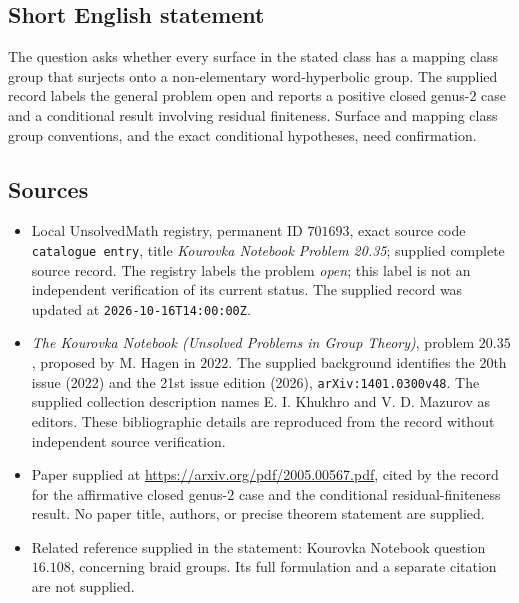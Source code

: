 \documentclass[11pt]{article}
\begin{document}
\subsection{Short English statement}
The question asks whether every surface in the stated class has a mapping class group that surjects onto a non-elementary word-hyperbolic group. The supplied record labels the general problem open and reports a positive closed genus-\(2\) case and a conditional result involving residual finiteness. Surface and mapping class group conventions, and the exact conditional hypotheses, need confirmation.
\subsection{Sources}
\begin{itemize}
\item Local UnsolvedMath registry, permanent ID \(701693\), exact source code \texttt{catalogue entry}, title \emph{Kourovka Notebook Problem 20.35}; supplied complete source record. The registry labels the problem \emph{open}; this label is not an independent verification of its current status. The supplied record was updated at \texttt{2026-10-16T14:00:00Z}.
\item \emph{The Kourovka Notebook (Unsolved Problems in Group Theory)}, problem \(20.35\), proposed by M. Hagen in \(2022\). The supplied background identifies the 20th issue (2022) and the 21st issue edition (2026), \texttt{arXiv:1401.0300v48}. The supplied collection description names E. I. Khukhro and V. D. Mazurov as editors. These bibliographic details are reproduced from the record without independent source verification.
\item Paper supplied at \url{https://arxiv.org/pdf/2005.00567.pdf}, cited by the record for the affirmative closed genus-\(2\) case and the conditional residual-finiteness result. No paper title, authors, or precise theorem statement are supplied.
\item Related reference supplied in the statement: Kourovka Notebook question \(16.108\), concerning braid groups. Its full formulation and a separate citation are not supplied.
\end{itemize}
\end{document}
